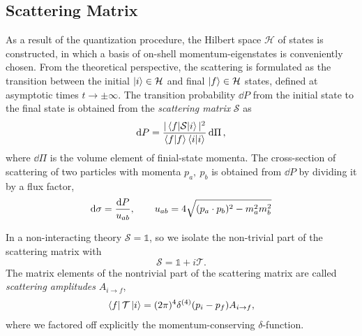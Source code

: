 \subsection{Scattering Matrix}
\label{sec:s-matr-pert}

As a result of the quantization procedure, the Hilbert space $\mathcal{H}$ of states is constructed,
in which a basis of on-shell momentum-eigenstates is conveniently chosen.
From the theoretical perspective, the scattering is formulated as the transition between
the initial $\ket{i}\in \mathcal{H}$ and final $\ket{f}\in \mathcal{H}$ states, defined
at asymptotic times $t\to \pm \infty$.
The transition probability $\dd{P}$ from the initial state to the final state is obtained from the \emph{scattering matrix} $\mathcal{S}$ as
\begin{equation}
  \dd{P} = \frac{\Abs{\mel{f}{\mathcal{S}}{i}}}{\ip{f}{f}\ip{i}{i}} \dd{\Pi},
\end{equation}
where $\dd{\Pi}$ is the volume element of finial-state momenta. 
The cross-section of scattering of two particles with momenta $p_a,\ p_b$ is obtained from $\dd{P}$ by dividing it by a flux factor,
\begin{equation}
  \dd{\sigma} = \frac{\dd{P}}{u_{ab}}, \qquad u_{ab} = 4 \sqrt{(\sp(p_a,p_b))^2 - m_a^2 m_b^2} 
\end{equation}


In a non-interacting theory $\mathcal{S}=\mathbb{1}$, so we isolate
the non-trivial part of the scattering matrix with
\begin{equation} \label{eq:tmatrix}
  \mathcal{S} = \mathbb{1}+i \mathcal{T}.
\end{equation}
The matrix elements of the nontrivial part of the scattering matrix are called \emph{scattering amplitudes} $A_{i\to f}$,
\begin{align} \label{eq:matrix_element}
  \bra{f}{\mathcal{T}}\ket{i} =  (2\pi)^4 \delta^{(4)}(p_i- p_f) A_{i\to f},
\end{align}
where we factored off explicitly the momentum-conserving $\delta$-function.


